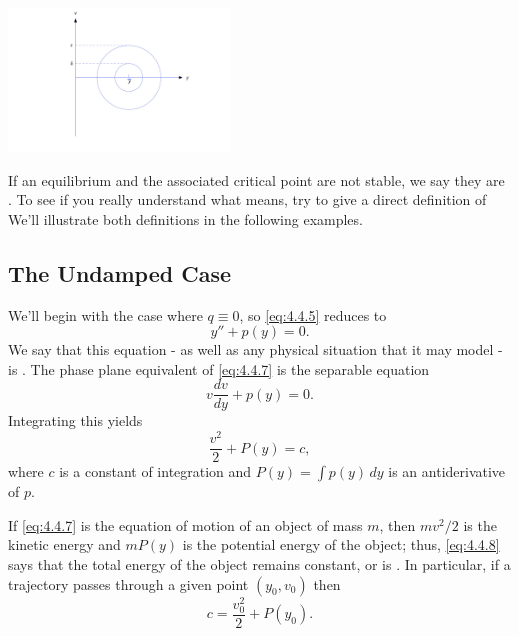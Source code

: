 \documentclass{ximera}
\begin{document}
\begin{image}
 \includegraphics[height=1.5in]{fig040401.jpg} 
\end{image}

If an equilibrium and the associated critical point are not stable, we
say they are . To see if you really understand what
 means, try to give a direct definition of 
We'll illustrate both definitions in
the following examples.


\subsection*{The Undamped Case}

We'll begin with the case where $q\equiv0$, so  \eqref{eq:4.4.5}
reduces to
 \begin{equation} \label{eq:4.4.7}
y''+p(y)=0.
\end{equation}
We say that this equation - as well as any physical situation
that it may model - is .
The phase plane equivalent of \eqref{eq:4.4.7} is  the
separable equation
$$
v\frac{dv}{dy}+p(y)=0.
$$
 Integrating this  yields
\begin{equation} \label{eq:4.4.8}
\frac{v^2}{2}+P(y)=c,
\end{equation}
where $c$ is a constant of integration and $P(y)=\int p(y)\,dy$ is an
antiderivative of $p$.

If \eqref{eq:4.4.7} is the equation of motion of an object of
mass $m$, then
 $mv^2/2$ is the kinetic energy and $mP(y)$ is the
potential energy of the object;   thus, \eqref{eq:4.4.8} says that the
total
energy of the object remains constant, or is . In
particular, if a trajectory passes through a given point $(y_0,v_0)$
then
$$
c=\frac{v_0^2}{2}+P(y_0).
$$
\end{document}
